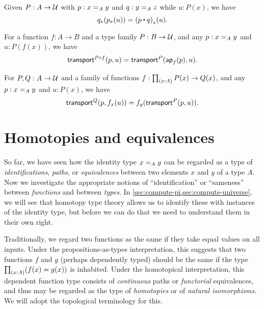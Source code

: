 \begin{lem}\label{thm:transport-concat}
  Given $P:A\to\type$ with $p:\id[A]xy$ and $q:\id[A]yz$ while $u:P(x)$, we have
  \[ \trans{q}{\trans{p}{u}} = \trans{(p\ct q)}{u}. \]
\end{lem}

\begin{lem}\label{thm:transport-compose}
  For a function $f:A\to B$ and a type family $P:B\to\type$, and any $p:\id[A]xy$ and $u:P(f(x))$, we have
  \[ \transfib{P\circ f}{p}{u} = \transfib{P}{\apfunc f(p)}{u}. \]
\end{lem}

\begin{lem}\label{thm:ap-transport}
  For $P,Q:A\to \type$ and a family of functions $f:\prd{x:A} P(x)\to Q(x)$, and any $p:\id[A]xy$ and $u:P(x)$, we have
  \[ \transfib{Q}{p}{f_x(u)} = f_y(\transfib{P}{p}{u}). \]
\end{lem}

%

\section{Homotopies and equivalences}
\label{sec:basics-equivalences}

%

So far, we have seen how the identity type $\id[A]xy$ can be regarded as a type of \emph{identifications}, \emph{paths}, or \emph{equivalences} between two elements $x$ and $y$ of a type $A$.
Now we investigate the appropriate notions of ``identification'' or ``sameness'' between \emph{functions} and between \emph{types}.
In \autoref{sec:compute-pi,sec:compute-universe}, we will see that homotopy type theory allows us to identify these with instances of the identity type, but before we can do that we need to understand them in their own right.

Traditionally, we regard two functions as the same if they take equal values on all inputs.
Under the propositions-as-types interpretation, this suggests that two functions $f$ and $g$ (perhaps dependently typed) should be the same if the type $\prd{x:A} (f(x)=g(x))$ is inhabited.
Under the homotopical interpretation, this dependent function type consists of \emph{continuous} paths or \emph{functorial} equivalences, and thus may be regarded as the type of \emph{homotopies} or of \emph{natural isomorphisms}.%
We will adopt the topological terminology for this.

